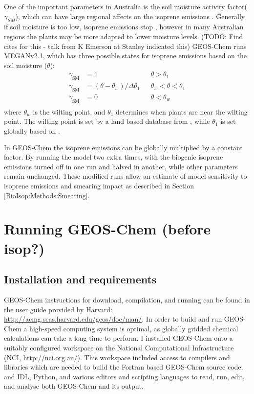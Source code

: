     One of the important parameters in Australia is the soil moisture activity factor($\gamma_{SM}$), which can have large regional affects on the isoprene emissions \citep{Sindelarova2014,Bauwens2016}.
    Generally if soil moisture is too low, isoprene emissions stop \citep{Pegoraro2004,Niinemets2010}, however in many Australian regions the plants may be more adapted to lower moisture levels. (TODO: Find cites for this - talk from K Emerson at Stanley indicated this)
    GEOS-Chem runs MEGANv2.1, which has three possible states for isoprene emissions based on the soil moisture ($\theta$):
    \begin{align*}
      \gamma_\mathrm{SM} & = 1 && \theta > \theta_1 \\
      \gamma_\mathrm{SM} & = (\theta-\theta_w)/\Delta\theta_1  && \theta_w < \theta < \theta_1 \\
      \gamma_\mathrm{SM} & = 0 && \theta < \theta_w \\
    \end{align*}
    where $\theta_w$ is the wilting point, and $\theta_1$ determines when plants are near the wilting point.
    The wilting point is set by a land based database from \citet{Chen2001}, while $\theta_1$ is set globally based on \citet{Pegoraro2004}.
    
    In GEOS-Chem the isoprene emissions can be globally multiplied by a constant factor.
    By running the model two extra times, with the biogenic isoprene emissions turned off in one run and halved in another, while other parameters remain unchanged. 
    These modified runs allow an estimate of model sensitivity to isoprene emissions and smearing impact as described in Section \ref{BioIsop:Methods:Smearing}.
    
  
    
\section{Running GEOS-Chem (before isop?)}
  \label{Model:GC_running}
  \subsection{Installation and requirements}
    GEOS-Chem instructions for download, compilation, and running can be found in the user guide provided by Harvard: \url{http://acmg.seas.harvard.edu/geos/doc/man/}.
    In order to build and run GEOS-Chem a high-speed computing system is optimal, as globally gridded chemical calculations can take a long time to perform.
    I installed GEOS-Chem onto a suitably configured workspace on the National Computational Infrastructure (NCI, \url{http://nci.org.au/}). 
    This workspace included access to compilers and libraries which are needed to build the Fortran based GEOS-Chem source code, and IDL, Python, and various editors and scripting languages to read, run, edit, and analyse both GEOS-Chem and its output.
      
